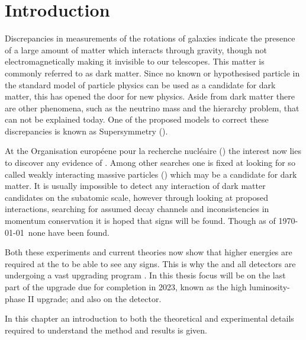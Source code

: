 \chapter{Introduction}\label{cha:intro}
Discrepancies in measurements of the rotations of galaxies indicate the presence of a large amount of matter which interacts through gravity, though not electromagnetically making it invisible to our telescopes. This matter is commonly referred to as dark matter. Since no known or hypothesised particle in the standard model of particle physics can be used as a candidate for dark matter, this has opened the door for new physics. Aside from dark matter there are other phenomena, such as the neutrino mass and the hierarchy problem, that can not be explained today. One of the proposed models to correct these discrepancies is known as Supersymmetry (\abbrSUSY).  

At the Organisation européene pour la recherche nucléaire (\abbrCERN) the interest now lies to discover any evidence of \abbrSUSY. Among other searches one is fixed at looking for so called weakly interacting massive particles (\abbrWIMPS) which may be a candidate for dark matter. It is usually impossible to detect any interaction of dark matter candidates on the subatomic scale, however through looking at proposed interactions, searching for assumed decay channels and inconsistencies in momentum conservation it is hoped that signs will be found. Though as of \today\ none have been found. 

Both these experiments and current theories now show that higher energies are required at the \abbrLHC to be able to see any signs. This is why the \abbrLHC and all detectors are undergoing a vast upgrading program \citep{ATLAS:LOI2}.
In this thesis focus will be on the last part of the upgrade due for completion in 2023, known as the high luminosity-\abbrLHC phase II upgrade; and also on the \abbrATLAS detector.

In this chapter an introduction to both the theoretical and experimental details required to understand the method and results is given. 

\newpage
